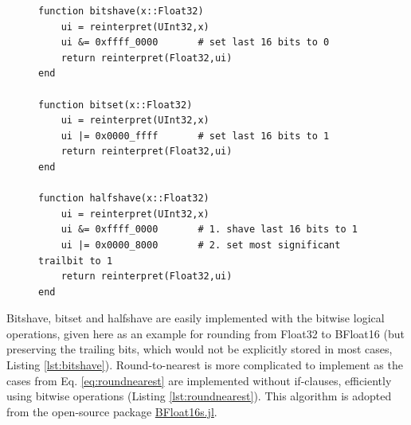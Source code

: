 \begin{figure}[tbhp]
\begin{lstlisting}[language=JuliaLocal, label=lst:bitshave, caption={\textbf{Bitwise implementation of bitshave, bitset and halfshave for
rounding to 7 mantissa bits.} Bitshave rounds a Float32 $x$ to $n_m = 7$ mantissa bits (equivalent to a BFloat16, but the trailing
bits remain stored) using the bitwise logical-and operation \&. For other numbers of mantissa bits to be retained the mask
\texttt{0xffff\_0000} has to be changed, e.g. \texttt{0xffff\_e000} will round to $n_m = 10$ mantissa bits. The function \texttt{reinterpret}
leaves the bits unchanged but changes the associated type. Bitset is implemented similar to bitshave but with the logical-or operation
$\vert$ which sets the trailing bits to \texttt{1}. Halfshave is similar to bitshave but the trailing bits are replaced by \texttt{100$...$0}.}]
function bitshave(x::Float32)
	ui = reinterpret(UInt32,x)
	ui &= 0xffff_0000	    # set last 16 bits to 0
	return reinterpret(Float32,ui)
end

function bitset(x::Float32)
	ui = reinterpret(UInt32,x)
	ui |= 0x0000_ffff    	# set last 16 bits to 1
	return reinterpret(Float32,ui)
end

function halfshave(x::Float32)
	ui = reinterpret(UInt32,x)
	ui &= 0xffff_0000    	# 1. shave last 16 bits to 1
	ui |= 0x0000_8000       # 2. set most significant trailbit to 1
	return reinterpret(Float32,ui)
end
\end{lstlisting}
\end{figure}
Bitshave, bitset and halfshave are easily implemented with the bitwise logical operations, given here as an example for rounding from
Float32 to BFloat16 (but preserving the trailing bits, which would not be explicitly stored in most cases, Listing \ref{lst:bitshave}). Round-to-nearest
is more complicated to implement as the cases from Eq. \ref{eq:roundnearest} are implemented without if-clauses, efficiently using bitwise
operations (Listing \ref{lst:roundnearest}). This algorithm is adopted from the open-source package
\href{https://github.com/JuliaComputing/BFloat16s.jl}{BFloat16s.jl}.

